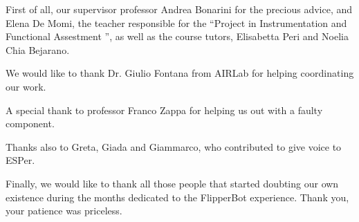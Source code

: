 \documentclass[a4paper,twoside]{book}
\begin{document}
First of all, our supervisor professor Andrea Bonarini for the precious advice, and Elena De Momi, the teacher responsible for the \textquotedblleft Project in Instrumentation and Functional Assestment \textquotedblright, as well as the course tutors, Elisabetta Peri and Noelia Chia Bejarano.

We would like to thank Dr. Giulio Fontana from AIRLab for helping coordinating our work.

A special thank to professor Franco Zappa for helping us out with a faulty component.

Thanks also to Greta, Giada and Giammarco, who contributed to give voice to ESPer.

Finally, we would like to thank all those people that started doubting our own existence during the months dedicated to the FlipperBot experience. Thank you, your patience was priceless.
\end{document}
